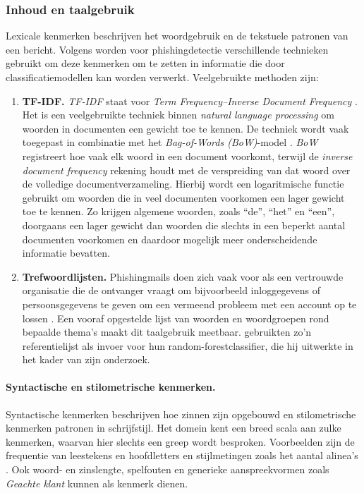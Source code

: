 \subsubsection{Inhoud en taalgebruik}%
\label{subsubsec:inhoud-taalgebruik}
Lexicale kenmerken beschrijven het woordgebruik en de tekstuele patronen van een bericht. Volgens \textcite{Salloum2022} worden voor phishingdetectie verschillende technieken gebruikt om deze kenmerken om te zetten in informatie die door classificatiemodellen kan worden verwerkt. Veelgebruikte methoden zijn:
\begin{enumerate}
    \item \textbf{TF-IDF.} \emph{TF-IDF} staat voor \emph{Term Frequency–Inverse Document Frequency} \autocite{ElKhair2009}. Het is een veelgebruikte techniek binnen \emph{natural language processing} om woorden in documenten een gewicht toe te kennen. De techniek wordt vaak toegepast in combinatie met het \emph{Bag-of-Words (BoW)}-model \autocite{Salloum2022}. \emph{BoW} registreert hoe vaak elk woord in een document voorkomt, terwijl de \emph{inverse document frequency} rekening houdt met de verspreiding van dat woord over de volledige documentverzameling. Hierbij wordt een logaritmische functie gebruikt om woorden die in veel documenten voorkomen een lager gewicht toe te kennen. Zo krijgen algemene woorden, zoals ``de'', ``het'' en ``een'', doorgaans een lager gewicht dan woorden die slechts in een beperkt aantal documenten voorkomen en daardoor mogelijk meer onderscheidende informatie bevatten.
    \item \textbf{Trefwoordlijsten.} Phishingmails doen zich vaak voor als een vertrouwde organisatie die de ontvanger vraagt om bijvoorbeeld inloggegevens of persoonsgegevens te geven om een vermeend probleem met een account op te lossen \autocite{Fette2007}. Een vooraf opgestelde lijst van woorden en woordgroepen rond bepaalde thema's maakt dit taalgebruik meetbaar. \textcite{Akinyelu2014} gebruikten zo'n referentielijst als invoer voor hun random-forestclassifier, die hij uitwerkte in het kader van zijn onderzoek.
\end{enumerate}

\paragraph{Syntactische en stilometrische kenmerken.} 
\label{subsubsec:inhoud-taalgebruik:stilometrische-kenmerken}
Syntactische kenmerken beschrijven hoe zinnen zijn opgebouwd en stilometrische kenmerken patronen in schrijfstijl. Het domein kent een breed scala aan zulke kenmerken, waarvan hier slechts een greep wordt besproken. Voorbeelden zijn de frequentie van leestekens en hoofdletters en stijlmetingen zoals het aantal alinea's \autocite{Stringhini2014}. Ook woord- en zinslengte, spelfouten en generieke aanspreekvormen zoals \emph{Geachte klant} kunnen als kenmerk dienen.

